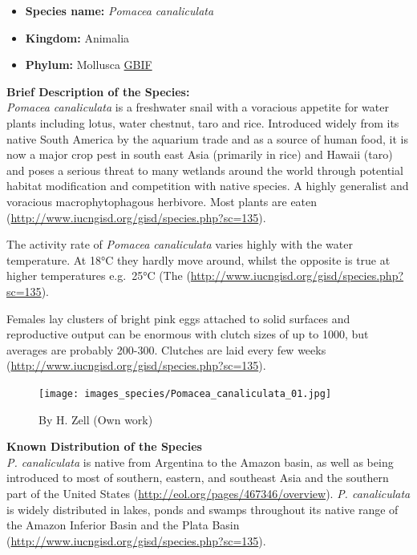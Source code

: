 \documentclass[]{book}
\providecommand{\tightlist}{%
  \setlength{\itemsep}{0pt}\setlength{\parskip}{0pt}}
\theoremstyle{definition}
\theoremstyle{definition}
\theoremstyle{definition}
\theoremstyle{remark}
\begin{document}
\begin{itemize}
\tightlist
\item
  \textbf{Species name:} \emph{Pomacea canaliculata}
\item
  \textbf{Kingdom:} Animalia
\item
  \textbf{Phylum:} Mollusca
  \href{https://www.gbif.org/species/2292582}{GBIF}
\end{itemize}

\textbf{Brief Description of the Species:}\\
\emph{Pomacea canaliculata} is a freshwater snail with a voracious
appetite for water plants including lotus, water chestnut, taro and
rice. Introduced widely from its native South America by the aquarium
trade and as a source of human food, it is now a major crop pest in
south east Asia (primarily in rice) and Hawaii (taro) and poses a
serious threat to many wetlands around the world through potential
habitat modification and competition with native species. A highly
generalist and voracious macrophytophagous herbivore. Most plants are
eaten (\url{http://www.iucngisd.org/gisd/species.php?sc=135}).

The activity rate of \emph{Pomacea canaliculata} varies highly with the
water temperature. At 18°C they hardly move around, whilst the opposite
is true at higher temperatures e.g.~25°C (The
(\url{http://www.iucngisd.org/gisd/species.php?sc=135}).

Females lay clusters of bright pink eggs attached to solid surfaces and
reproductive output can be enormous with clutch sizes of up to 1000, but
averages are probably 200-300. Clutches are laid every few weeks
(\url{http://www.iucngisd.org/gisd/species.php?sc=135}).

\begin{figure}
\centering
\texttt{[image: images\_species/Pomacea\_canaliculata\_01.jpg]}
\caption{By H. Zell (Own work)}
\end{figure}

\textbf{Known Distribution of the Species}\\
\emph{P. canaliculata} is native from Argentina to the Amazon basin, as
well as being introduced to most of southern, eastern, and southeast
Asia and the southern part of the United States
(\url{http://eol.org/pages/467346/overview}). \emph{P. canaliculata} is
widely distributed in lakes, ponds and swamps throughout its native
range of the Amazon Inferior Basin and the Plata Basin
(\url{http://www.iucngisd.org/gisd/species.php?sc=135}).
\end{document}
